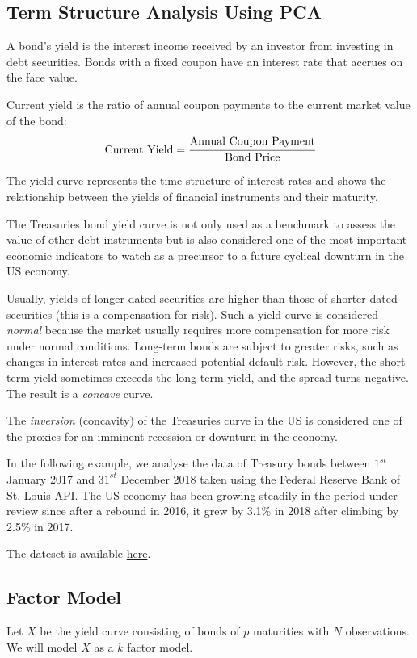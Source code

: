 \subsection{Term Structure Analysis Using PCA}

A bond’s yield is the interest income received by an investor from investing in debt securities. Bonds with a fixed coupon have an interest rate that accrues on the face value.

Current yield is the ratio of annual coupon payments to the current market value of the bond:
$$
\text{Current Yield} = \cfrac{\text{Annual Coupon Payment}}{\text{Bond Price}}
$$

The yield curve represents the time structure of interest rates and shows the relationship between the yields of financial instruments and their maturity.

The Treasuries bond yield curve is not only used as a benchmark to assess the value of other debt instruments but is also considered one of the most important economic indicators to watch as a precursor to a future cyclical downturn in the US economy.

Usually, yields of longer-dated securities are higher than those of shorter-dated securities (this is a compensation for risk).
Such a yield curve is considered \emph{normal} because the market usually requires more compensation for more risk under normal conditions. Long-term bonds are subject to greater risks, such as changes in interest rates and increased potential default risk.
However, the short-term yield sometimes exceeds the long-term yield, and the spread turns negative. The result is a \emph{concave} curve.

The \emph{inversion} (concavity) of the Treasuries curve in the US is considered one of the proxies for an imminent recession or downturn in the economy.

In the following example, we analyse the data of Treasury bonds between $1^{st}$ January 2017 and $31^{st}$ December 2018 taken using the Federal Reserve Bank of St. Louis API.
The US economy has been growing steadily in the period under review since after a rebound in 2016, it grew by 3.1\% in 2018 after climbing by 2.5\% in 2017.

The dateset is available \href{https://github.com/matteosan1/finance_course/raw/develop/input_files/DGS_2017_2018.csv"}{here}.

\subsection{Factor Model}
Let $X$ be the yield curve consisting of bonds of $p$ maturities with $N$ observations. We will model $X$ as a $k$ factor model.

